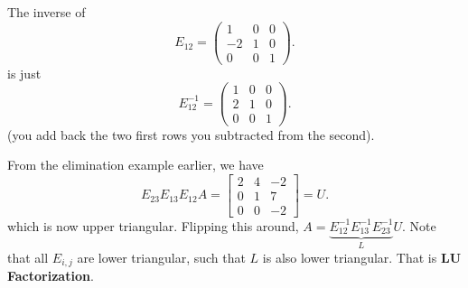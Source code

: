 \begin{eg}
	The inverse of \[
		E_{12} = \begin{pmatrix}
			1 & 0 & 0 \\ -2 & 1 & 0 \\ 0 & 0 & 1
		\end{pmatrix}
	.\] is just \[
		E_{12}^{-1}  = \begin{pmatrix}
			1 & 0 & 0 \\ 2 & 1 & 0 \\ 0 & 0 & 1
		\end{pmatrix}
	.\] (you add back the two first rows you subtracted from the second).
\end{eg}

From the elimination example earlier, we have \[
	E_{23}E_{13}E_{12}A = \begin{bmatrix}
		2 & 4 & -2 \\
		0 & 1 & 7 \\
		0 & 0 & -2  
	\end{bmatrix} = U
.\] which is now upper triangular. Flipping this around, \( A = \underbrace{E_{12}^{-1}E_{13}^{-1}E_{23}^{-1}}_{L}U \). Note that all \( E_{i,j} \) are lower triangular, such that \( L \) is also lower triangular. That is \textbf{LU Factorization}.
